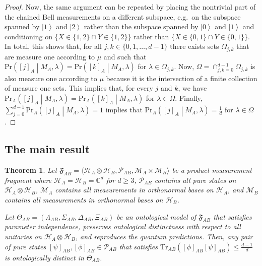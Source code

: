 \documentclass[DIV=calc,paper=a4,fontsize=11pt,twocolumn]{scrartcl} %
\theoremstyle{definition}
\theoremstyle{plain}
\newtheorem{theorem}[definition]{Theorem}
\newcommand{\Ket}[1]{\ensuremath{\left \vert #1 \right \rangle}}
\newcommand{\Proj}[1]{\ensuremath{\left [ #1 \right ]}}
\newcommand{\Hilb}[1][]{\ensuremath{\mathcal{H}_{#1}}}
\newcommand{\Tr}[2][]{\ensuremath{\text{Tr}_{#1} \left ( #2 \right )}}
\begin{document}
\begin{proof}
Now, the same argument can be repeated by placing the nontrivial
part of the chained Bell measurements on a different subspace, e.g.\
on the subspace spanned by $\Ket{1}$ and $\Ket{2}$ rather than the
subspace spanned by $\Ket{0}$ and $\Ket{1}$ and conditioning on $\{X
\in \{1,2\} \cap Y \in \{1,2\}\}$ rather than $\{X \in \{0,1\} \cap
Y \in \{0,1\}\}$.  In total, this shows that, for all $j,k \in
\{0,1,\ldots,d-1\}$ there exists sets $\Omega_{j,k}$ that are
measure one according to $\mu$ and such that $\text{Pr} \left (
\Proj{j}_A \middle | M_A, \lambda \right ) = \text{Pr} \left (
\Proj{k}_A \middle | M_A, \lambda \right )$ for $\lambda \in
\Omega_{j,k}$.  Now, $\Omega = \cap_{j,k = 0}^{d-1} \Omega_{j,k}$ is
also measure one according to $\mu$ because it is the intersection
of a finite collection of measure one sets.  This implies that, for
every $j$ and $k$, we have $\text{Pr}_A \left ( \Proj{j}_A \middle |
M_A, \lambda \right ) = \text{Pr}_A \left ( \Proj{k}_A \middle |
M_A, \lambda \right )$ for $\lambda \in \Omega$.  Finally,
$\sum_{j=0}^{d-1} \text{Pr}_A \left ( \Proj{j}_A \middle | M_A,
\lambda \right ) = 1$ implies that $\text{Pr}_A \left ( \Proj{j}_A
\middle | M_A, \lambda \right ) = \frac{1}{d}$ for $\lambda \in
\Omega$.
\end{proof}

\subsection{The main result}

\label{CR:Main}

\begin{theorem}
\label{thm:CR:CR}
Let $\mathfrak{F}_{AB} = \langle \Hilb[A] \otimes \Hilb[B],
\mathcal{P}_{AB}, \mathcal{M}_A \times \mathcal{M}_B \rangle$ be a
product measurement fragment where $\Hilb[A] = \Hilb[B] =
\mathbb{C}^d$ for $d \geq 3$, $\mathcal{P}_{AB}$ contains all pure
states on $\Hilb[A] \otimes \Hilb[B]$, $\mathcal{M}_A$ contains all
measurements in orthonormal bases on $\Hilb[A]$, and $\mathcal{M}_B$
contains all measurements in orthonormal bases on $\Hilb[B]$.

Let $\Theta_{AB} = (\Lambda_{AB}, \Sigma_{AB}, \Delta_{AB},
\Xi_{AB})$ be an ontological model of $\mathfrak{F}_{AB}$ that
satisfies parameter independence, preserves ontological distinctness
with respect to all unitaries on $\Hilb[A] \otimes \Hilb[B]$, and
reproduces the quantum predictions.  Then, any pair of pure states
$\Proj{\psi}_{AB}, \Proj{\phi}_{AB} \in \mathcal{P}_{AB}$ that
satisfies $\Tr[AB]{\Proj{\phi}_{AB}\Proj{\psi}_{AB}} \leq
\frac{d-1}{d}$ is ontologically distinct in $\Theta_{AB}$.
\end{theorem}
\end{document}
